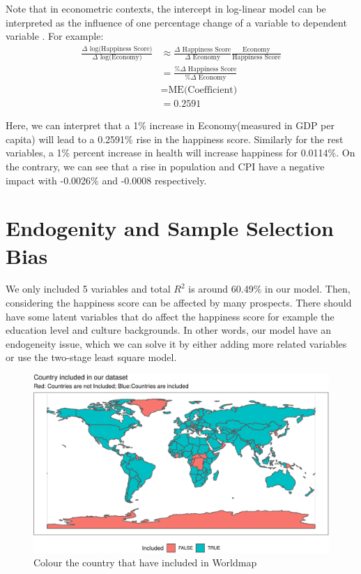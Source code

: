 \documentclass[11pt,a4paper,]{article}
\begin{document}
Note that in econometric contexts, the intercept in log-linear model can be interpreted as the influence of one percentage change of a variable to dependent variable \autocite{benoit2011}. For example:
\begin{align*}
\frac{\Delta \text{ log(Happiness Score)}}{\Delta \text{ log(Economy)}} &\approx \frac{\Delta \text{ Happiness Score}}{\Delta \text{ Economy} }\frac{\text{Economy}}{\text{Happiness Score}}\\
&=\frac{\% \Delta \text{ Happiness Score}}{\% \Delta \text{ Economy}} \nonumber\\
&= \text{ME(Coefficient)}\nonumber\\
&= 0.2591
\end{align*}

Here, we can interpret that a 1\% increase in Economy(measured in GDP per capita) will lead to a 0.2591\% rise in the happiness score. Similarly for the rest variables, a 1\% percent increase in health will increase happiness for 0.0114\%. On the contrary, we can see that a rise in population and CPI have a negative impact with -0.0026\% and -0.0008 respectively.

\hypertarget{endogenity-and-sample-selection-bias}{%
\section{Endogenity and Sample Selection Bias}\label{endogenity-and-sample-selection-bias}}

We only included 5 variables and total \(R^2\) is around 60.49\% in our model. Then, considering the happiness score can be affected by many prospects. There should have some latent variables that do affect the happiness score for example the education level and culture backgrounds. In other words, our model have an endogeneity issue, which we can solve it by either adding more related variables or use the two-stage least square model.

\begin{figure}
\centering
\includegraphics{Assignment4_files/figure-latex/worldmapall-1.pdf}
\caption{\label{fig:worldmapall}Colour the country that have included in Worldmap}
\end{figure}
\end{document}
